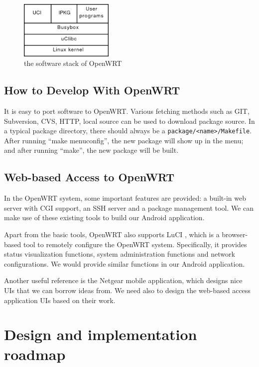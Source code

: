 \documentclass{sig-alternate-05-2015}
\begin{document}
	\begin{figure}
		\centering
		\includegraphics[width=0.4\textwidth]{stack.png}
		\caption{the software stack of OpenWRT}
		\label{OpenWRT:stack}
	\end{figure}
	
	\subsection{How to Develop With OpenWRT}
	
	It is easy to port software to OpenWRT. Various fetching methods such as GIT, Subversion, CVS, HTTP, local source can be used to download package source. In a typical package directory, there should always be a \verb|package/<name>/Makefile|. After running ``make menuconfig'', the new package will show up in the menu; and after running ``make'', the new package will be built.
	
	\subsection{Web-based Access to OpenWRT}
	In the OpenWRT system, some important features are provided: a built-in web server with CGI support, an SSH server and a package management tool. We can make use of these existing tools to build our Android application.
	
	Apart from the basic tools, OpenWRT also supports LuCI \cite{LuCI}, which is a browser-based tool to remotely configure the OpenWRT system. Specifically, it provides status visualization functions, system administration functions and network configurations. We would provide similar functions in our Android application.
	
	Another useful reference is the Netgear \cite{netgear} mobile application, which designs nice UIs that we can borrow ideas from. We need also to design the web-based access application UIs based on their work.
	
	\section{Design and implementation \\ roadmap}
	
\end{document}
